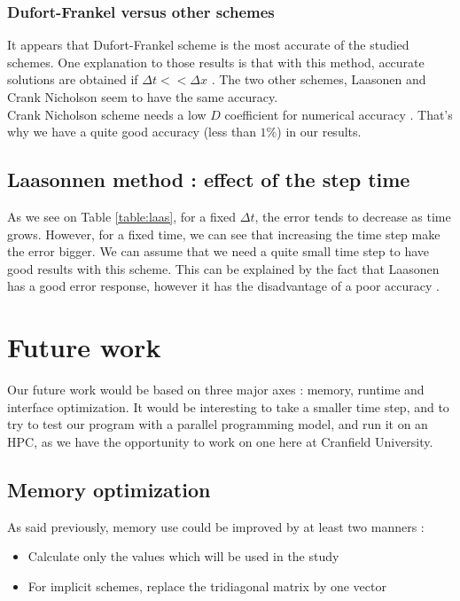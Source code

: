 \documentclass{article}
\begin{document}
            \subsubsection{Dufort-Frankel versus other schemes}
                It appears that Dufort-Frankel scheme is the most accurate of the studied schemes. One explanation to those
                results is that with this method, accurate solutions are obtained if $\Delta t << \Delta x$ \cite{df}.
                The two other schemes, Laasonen and Crank Nicholson seem to have the same accuracy.
                \\
                Crank Nicholson scheme needs a low $D$ coefficient for numerical accuracy \cite{crank}. That's why 
                we have a quite good accuracy (less than $1\%$) in our results.

            
        \subsection{Laasonnen method : effect of the step time}
            As we see on Table \ref{table:laas}, for a fixed $\Delta t$, the error tends to decrease as time grows. However,
            for a fixed time, we can see that increasing the time step make the error bigger. We can assume that we need a
            quite small time step to have good results with this scheme. This can be explained by the fact that
            Laasonen has a good error response, however it has the disadvantage of a poor accuracy \cite{laas}.
    \newpage
    \section{Future work}
        Our future work would be based on three major axes : memory, runtime and interface optimization.
        It would be interesting to take a smaller time step, and to try to test our program
        with a parallel programming model, and run it on an HPC, as we have the opportunity 
        to work on one here at Cranfield University.
        \subsection{Memory optimization}
            As said previously, memory use could be improved by at least two manners :
            \begin{itemize}
                \item{Calculate only the values which will be used in the study}
                \item{For implicit schemes, replace the tridiagonal matrix by one vector}
            \end{itemize}
\end{document}
